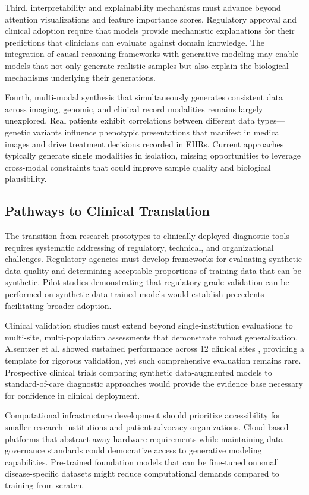 Third, interpretability and explainability mechanisms must advance beyond attention visualizations and feature importance scores. Regulatory approval and clinical adoption require that models provide mechanistic explanations for their predictions that clinicians can evaluate against domain knowledge. The integration of causal reasoning frameworks with generative modeling may enable models that not only generate realistic samples but also explain the biological mechanisms underlying their generations.

Fourth, multi-modal synthesis that simultaneously generates consistent data across imaging, genomic, and clinical record modalities remains largely unexplored. Real patients exhibit correlations between different data types—genetic variants influence phenotypic presentations that manifest in medical images and drive treatment decisions recorded in EHRs. Current approaches typically generate single modalities in isolation, missing opportunities to leverage cross-modal constraints that could improve sample quality and biological plausibility.

\subsection{Pathways to Clinical Translation}

The transition from research prototypes to clinically deployed diagnostic tools requires systematic addressing of regulatory, technical, and organizational challenges. Regulatory agencies must develop frameworks for evaluating synthetic data quality and determining acceptable proportions of training data that can be synthetic. Pilot studies demonstrating that regulatory-grade validation can be performed on synthetic data-trained models would establish precedents facilitating broader adoption.

Clinical validation studies must extend beyond single-institution evaluations to multi-site, multi-population assessments that demonstrate robust generalization. Alsentzer et al. showed sustained performance across 12 clinical sites \cite{alsentzer2025few}, providing a template for rigorous validation, yet such comprehensive evaluation remains rare. Prospective clinical trials comparing synthetic data-augmented models to standard-of-care diagnostic approaches would provide the evidence base necessary for confidence in clinical deployment.

Computational infrastructure development should prioritize accessibility for smaller research institutions and patient advocacy organizations. Cloud-based platforms that abstract away hardware requirements while maintaining data governance standards could democratize access to generative modeling capabilities. Pre-trained foundation models that can be fine-tuned on small disease-specific datasets might reduce computational demands compared to training from scratch.

